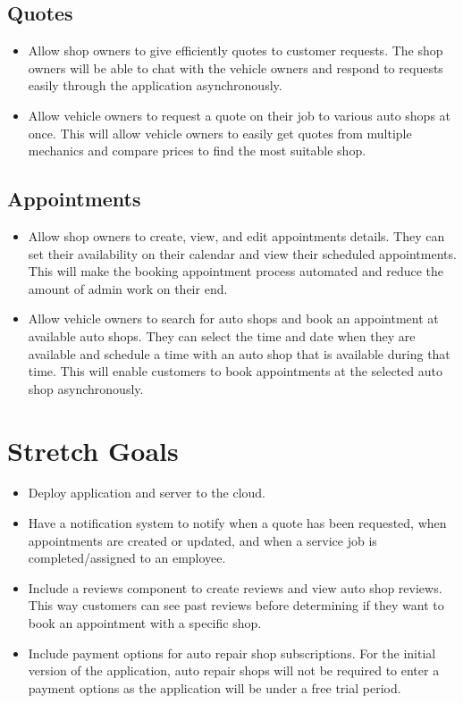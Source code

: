 \documentclass{article}
\begin{document}
\subsection{Quotes}
\begin{itemize}
    \item Allow shop owners to give efficiently quotes to customer requests. The shop owners will be able to 
    chat with the vehicle owners and respond to requests easily through the application asynchronously.
    \item Allow vehicle owners to request a quote on their job to various auto shops at once. This will 
    allow vehicle owners to easily get quotes from multiple mechanics and compare prices to find the most suitable shop.
\end{itemize}

\subsection{Appointments}
\begin{itemize}
    \item Allow shop owners to create, view, and edit appointments details. They can set their availability on 
    their calendar and view their scheduled appointments. This will make the booking appointment process 
    automated and reduce the amount of admin work on their end.
    \item Allow vehicle owners to search for auto shops and book an appointment at available auto shops. 
    They can select the time and date when they are available and schedule a time with an auto shop that 
    is available during that time. This will enable customers to book appointments at the selected auto shop asynchronously.
\end{itemize}

\section{Stretch Goals}
\begin{itemize}
    \item Deploy application and server to the cloud.
    \item Have a notification system to notify when a quote has been requested, when appointments 
    are created or updated, and when a service job is completed/assigned to an employee.
    \item Include a reviews component to create reviews and view auto shop reviews. This 
    way customers can see past reviews before determining if they want to book an appointment with a specific shop.
    \item Include payment options for auto repair shop subscriptions. For the initial version of the application,
    auto repair shops will not be required to enter a payment options as the application will be under a free trial period.
\end{itemize}
\end{document}
